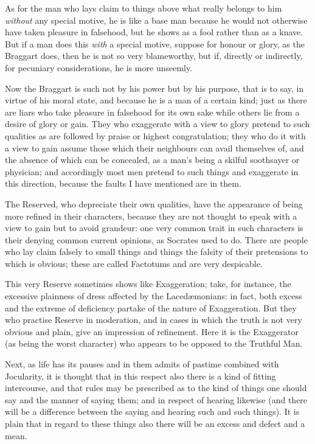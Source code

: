 As for the man who lays claim to things above what really belongs to him
\emph{without} any special motive, he is like a base man because he would not
otherwise have taken pleasure in falsehood, but he shows as a fool rather than
as a knave. But if a man does this \emph{with} a special motive, suppose for
honour or glory, as the Braggart does, then he is not so very blameworthy, but
if, directly or indirectly, for pecuniary considerations, he is more unseemly.

Now the Braggart is such not by his power but by his purpose, that is to say,
in virtue of his moral state, and because he is a man of a certain kind; just
as there are liars who take pleasure in falsehood for its own sake while others
lie from a desire of glory or gain. They who exaggerate with a view to glory
pretend to such qualities as are followed by praise or highest congratulation;
they who do it with a view to gain assume those which their neighbours can
avail themselves of, and the absence of which can be concealed, as a
man’s being a skilful soothsayer or physician; and accordingly most men
pretend to such things and exaggerate in this direction, because the faults I
have mentioned are in them.

The Reserved, who depreciate their own qualities, have the appearance of being
more refined in their characters, because they are not thought to speak with a
view to gain but to avoid grandeur: one very common trait in such characters is
their denying common current opinions, as Socrates used to do. There are people
who lay claim falsely to small things and things the falsity of their
pretensions to which is obvious; these are called Factotums and are very
despicable.

This very Reserve sometimes shows like Exaggeration; take, for instance, the
excessive plainness of dress affected by the Lacedæmonians: in fact, both
excess and the extreme of deficiency partake of the nature of Exaggeration. But
they who practise Reserve in moderation, and in cases in which the truth is not
very obvious and plain, give an impression of refinement. Here it is the
Exaggerator (as being the worst character) who appears to be opposed to the
Truthful Man.


Next, as life has its pauses and in them admits of pastime combined with
Jocularity, it is thought that in this respect also there is a kind of fitting
intercourse, and that rules may be prescribed as to the kind of things one
should say and the manner of saying them; and in respect of hearing likewise
(and there will be a difference between the saying and hearing such and such
things). It is plain that in regard to these things also there will be an
excess and defect and a mean.

